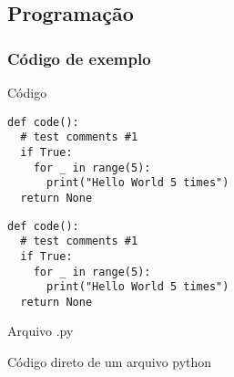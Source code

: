 \documentclass[table,xcolor=table]{IFMG-beamer}
\begin{document}
\subsection{Programação}
\begin{frame}[fragile]

\frametitle{Código de exemplo}



\begin{block}{Código}
\begin{lstlisting}
def code():
  # test comments #1    
  if True:
    for _ in range(5):
      print("Hello World 5 times")
  return None     
\end{lstlisting}
\end{block}

\begin{lstlisting}[backgroundcolor = \color{lightgray}]
def code():
  # test comments #1    
  if True:
    for _ in range(5):
      print("Hello World 5 times")
  return None     
\end{lstlisting}

\end{frame}


\begin{frame}{Arquivo .py}
    \begin{block}{Código direto de um arquivo python}
        \inputminted{python}{codigos/codigo.py}
    \end{block}
    
\end{frame}
\end{document}
